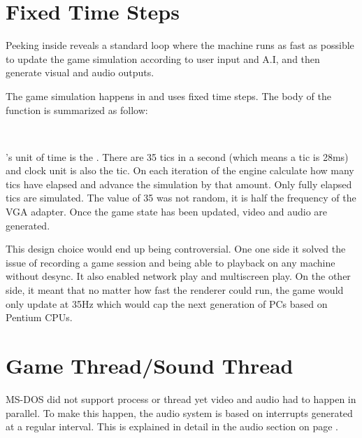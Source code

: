 \section{Fixed Time Steps}
Peeking inside  reveals a standard loop where the machine runs as fast as possible to update the game simulation according to user input and A.I, and then generate visual and audio outputs.\\
\par
{}
The game simulation happens in  and uses fixed time steps. The body of the function is summarized as follow:\\
\par
{}\label{TryRunTics.c}\\
\par
\doom's unit of time is the . There are 35 tics in a second (which means a tic is 28ms) and 
 clock unit is also the tic. On each iteration of  the engine calculate how many tics have elapsed and advance the simulation by that amount. Only fully elapsed tics are simulated. The value of 35 was not random, it is half the frequency of the VGA adapter. Once the game state has been updated, video and audio are generated.\\
\par
{}
\par
This design choice would end up being controversial. One one side it solved the issue of recording a game session and being able to playback on any machine without desync. It also enabled network play and multiscreen play. On the other side, it meant that no matter how fast the renderer could run, the game would only update at 35Hz which would cap the next generation of PCs based on Pentium CPUs.\\
\par



\section{Game Thread/Sound Thread}
MS-DOS did not support process or thread yet video and audio had to happen in parallel. To make this happen, the audio system is based on interrupts generated at a regular interval. This is explained in detail in the audio section on page \pageref{dmx_section}.\\







